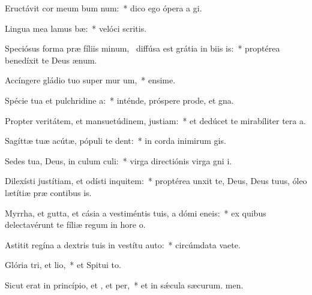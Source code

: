 \item Eructávit cor meum bum num:~* dico ego ópera a gi.
\item Lingua mea lamus bæ:~* velóci scritis.
\item Speciósus forma præ fíliis minum,~\pscross{} diffúsa est grátia in biis is:~* proptérea benedíxit te Deus  ænum.
\item Accíngere gládio tuo super mur um,~* ensime.
\item Spécie tua et pulchridine a:~* inténde, próspere prode, et gna.
\item Propter veritátem, et mansuetúdinem,  justiam:~* et dedúcet te mirabíliter tera a.
\item Sagíttæ tuæ acútæ, pópuli  te dent:~* in corda inimirum gis.
\item Sedes tua, Deus, in culum culi:~* virga directiónis virga gni i.
\item Dilexísti justítiam, et odísti inquitem:~* proptérea unxit te, Deus, Deus tuus, óleo lætítiæ præ contibus is.
\item Myrrha, et gutta, et cásia a vestiméntis tuis, a dómi eneis:~* ex quibus delectavérunt te fíliæ regum in hore o.
\item Astitit regína a dextris tuis in vestítu auto:~* circúmdata vaete.
\item Glória tri, et lio,~* et Spitui to.
\item Sicut erat in princípio, et , et per,~* et in sǽcula sæcurum. men.
